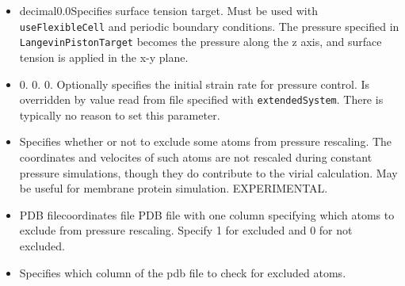 \begin{itemize}
\item
{}
{decimal}{0.0}{Specifies surface tension target.  Must be used with 
{\tt useFlexibleCell} and periodic boundary conditions.  The pressure 
specified in {\tt LangevinPistonTarget} becomes the pressure along the z
axis, and surface tension is applied in the x-y plane.}

\item
{}
{0. 0. 0.}
{Optionally specifies the initial strain rate for pressure control.
Is overridden by value read from file specified with {\tt extendedSystem}.
There is typically no reason to set this parameter.}

\item
{}
{Specifies whether or not to exclude some atoms from pressure rescaling.  The
coordinates and velocites of such atoms are not rescaled during constant
pressure simulations, though they do contribute to the virial calculation. 
May be useful for membrane protein simulation.  EXPERIMENTAL.}

\item
{}
{PDB file}{coordinates file}
{PDB file with one column specifying which atoms to exclude from pressure
rescaling.  Specify 1 for excluded and 0 for not excluded.}

\item
{}
{Specifies which column of the pdb file to check for excluded atoms.}

\end{itemize}

